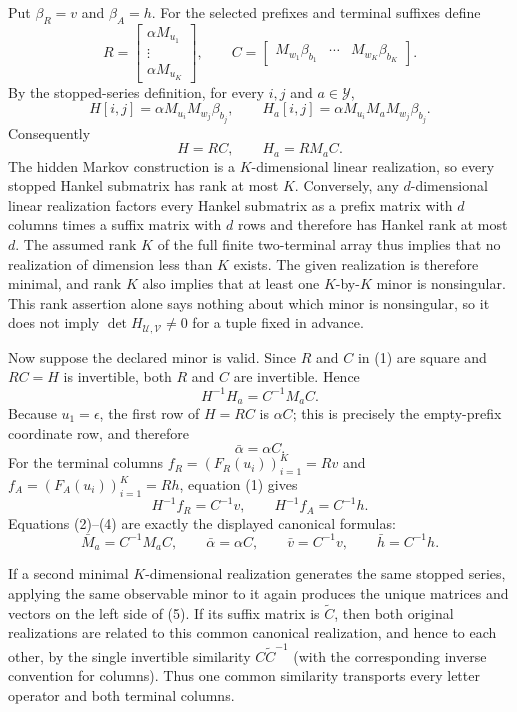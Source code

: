 Put \(\beta_R=v\) and \(\beta_A=h\).  For the selected prefixes and terminal suffixes define
\[
 R=\begin{bmatrix}\alpha M_{u_1}\\ \vdots\\ \alpha M_{u_K}\end{bmatrix},
 \qquad
 C=\begin{bmatrix}M_{w_1}\beta_{b_1}&\cdots&M_{w_K}\beta_{b_K}\end{bmatrix}.
\]
By the stopped-series definition, for every \(i,j\) and \(a\in\mathcal Y\),
\[
 H[i,j]=\alpha M_{u_i}M_{w_j}\beta_{b_j},
 \qquad
 H_a[i,j]=\alpha M_{u_i}M_aM_{w_j}\beta_{b_j}.
\]
Consequently
\[
 H=RC,
 \qquad
 H_a=RM_aC.                                                    \tag{1}
\]
The hidden Markov construction is a \(K\)-dimensional linear realization, so every stopped Hankel submatrix has rank at most \(K\).  Conversely, any \(d\)-dimensional linear realization factors every Hankel submatrix as a prefix matrix with \(d\) columns times a suffix matrix with \(d\) rows and therefore has Hankel rank at most \(d\).  The assumed rank \(K\) of the full finite two-terminal array thus implies that no realization of dimension less than \(K\) exists.  The given realization is therefore minimal, and rank \(K\) also implies that at least one \(K\)-by-\(K\) minor is nonsingular.  This rank assertion alone says nothing about which minor is nonsingular, so it does not imply \(\det H_{\mathcal U,\mathcal V}\ne0\) for a tuple fixed in advance.

Now suppose the declared minor is valid.  Since \(R\) and \(C\) in (1) are square and \(RC=H\) is invertible, both \(R\) and \(C\) are invertible.  Hence
\[
 H^{-1}H_a=C^{-1}M_aC.                                         \tag{2}
\]
Because \(u_1=\epsilon\), the first row of \(H=RC\) is \(\alpha C\); this is precisely the empty-prefix coordinate row, and therefore
\[
 \bar\alpha=\alpha C.                                         \tag{3}
\]
For the terminal columns \(f_R=(F_R(u_i))_{i=1}^K=Rv\) and \(f_A=(F_A(u_i))_{i=1}^K=Rh\), equation (1) gives
\[
 H^{-1}f_R=C^{-1}v,
 \qquad
 H^{-1}f_A=C^{-1}h.                                            \tag{4}
\]
Equations (2)--(4) are exactly the displayed canonical formulas:
\[
 \bar M_a=C^{-1}M_aC,
 \qquad
 \bar\alpha=\alpha C,
 \qquad
 \bar v=C^{-1}v,
 \qquad
 \bar h=C^{-1}h.                                               \tag{5}
\]

If a second minimal \(K\)-dimensional realization generates the same stopped series, applying the same observable minor to it again produces the unique matrices and vectors on the left side of (5).  If its suffix matrix is \(\widetilde C\), then both original realizations are related to this common canonical realization, and hence to each other, by the single invertible similarity \(C\widetilde C^{-1}\) (with the corresponding inverse convention for columns).  Thus one common similarity transports every letter operator and both terminal columns.

